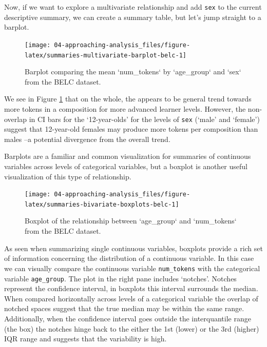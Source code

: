 \documentclass[
]{article}
\begin{document}
Now, if we want to explore a multivariate relationship and add \texttt{sex} to the current descriptive summary, we can create a summary table, but let's jump straight to a barplot.

\begin{figure}

{\centering \texttt{[image: 04-approaching-analysis\_files/figure-latex/summaries-multivariate-barplot-belc-1]} 

}

\caption{Barplot comparing the mean `num_tokens` by `age_group` and `sex` from the BELC dataset.}\label{fig:summaries-multivariate-barplot-belc}
\end{figure}

We see in Figure \ref{fig:summaries-multivariate-barplot-belc} that on the whole, the appears to be general trend towards more tokens in a composition for more advanced learner levels. However, the non-overlap in CI bars for the `12-year-olds' for the levels of \texttt{sex} (`male' and `female') suggest that 12-year-old females may produce more tokens per composition than males --a potential divergence from the overall trend.

Barplots are a familiar and common visualization for summaries of continuous variables across levels of categorical variables, but a boxplot is another useful visualization of this type of relationship.

\begin{figure}

{\centering \texttt{[image: 04-approaching-analysis\_files/figure-latex/summaries-bivariate-boxplots-belc-1]} 

}

\caption{Boxplot of the relationship between `age_group` and `num_tokens` from the BELC dataset.}\label{fig:summaries-bivariate-boxplots-belc}
\end{figure}

As seen when summarizing single continuous variables, boxplots provide a rich set of information concerning the distribution of a continuous variable. In this case we can visually compare the continuous variable \texttt{num\_tokens} with the categorical variable \texttt{age\_group}. The plot in the right pane includes `notches'. Notches represent the confidence interval, in boxplots this interval surrounds the median. When compared horizontally across levels of a categorical variable the overlap of notched spaces suggest that the true median may be within the same range.
Additionally, when the confidence interval goes outside the interquantile range (the box) the notches hinge back to the either the 1st (lower) or the 3rd (higher) IQR range and suggests that the variability is high.
\end{document}
